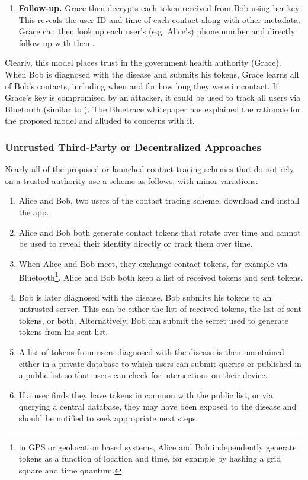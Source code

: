 \documentclass[11pt]{article} %
\begin{document}
{\begin{enumerate}
		\item\textbf{Follow-up.} Grace then decrypts each token received from Bob using her key. This reveals the user ID and time of each contact along with other metadata. Grace can then look up each user's (e.g. Alice's) phone number and directly follow up with them.
		
	\end{enumerate}
	
	Clearly, this model places trust in the government health authority (Grace). When Bob is diagnosed with the disease and submits his tokens, Grace learns all of Bob's contacts, including when and for how long they were in contact. If Grace's key is compromised by an attacker, it could be used to track all users via Bluetooth (similar to \cite{bluetooth-tracking}).
	The Bluetrace whitepaper has explained the rationale for the proposed model and alluded to concerns with it.
	
	
	
	\subsubsection{Untrusted Third-Party or Decentralized Approaches}
	
	Nearly all of the proposed or launched contact tracing schemes that do not rely on a trusted authority use a scheme as follows, with minor variations:
	
	\begin{enumerate}
		\item Alice and Bob, two users of the contact tracing scheme, download and install the app.
		\item Alice and Bob both generate contact tokens that rotate over time and cannot be used to reveal their identity directly or track them over time.
		\item When Alice and Bob meet, they exchange contact tokens, for example via Bluetooth\footnote{in GPS or geolocation based systems, Alice and Bob independently generate tokens as a function of location and time, for example by hashing a grid square and time quantum.}. Alice and Bob both keep a list of received tokens and sent tokens.
		\item Bob is later diagnosed with the disease. Bob submits his tokens to an untrusted server. This can be either the list of received tokens, the list of sent tokens, or both. Alternatively, Bob can submit the secret used to generate tokens from his sent list.
		\item A list of tokens from users diagnosed with the disease is then maintained either in a private database to which users can submit queries or published in a public list so that users can check for intersections on their device.
		\item If a user finds they have tokens in common with the public list, or via querying a central database, they may have been exposed to the disease and should be notified to seek appropriate next steps.
	\end{enumerate}
	
}
\end{document}
